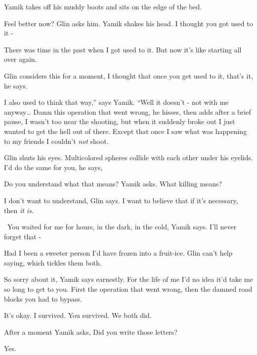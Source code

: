 \documentclass[letterpaper]{article}
\begin{document}
Yamik takes off his muddy boots and sits on the edge of the bed. 

{\textquotedbl}Feel better now?{\textquotedbl} Glin asks him. Yamik shakes his
head.{ }{\textquotedbl}I thought you got used to it -{\textquotedbl} 

{\textquotedbl}There was time in the past when I got used to it. But now it's like starting all over
again.{\textquotedbl} 

Glin considers this for a moment, {\textquotedbl}I thought that once you get used to it, that's it,{\textquotedbl} he
says.

{\textquotedbl}I also used to think that way,'' says Yamik. ``Well it doesn't - not with me anyway{\dots} Damn this
operation that went wrong,{\textquotedbl} he hisses, then adds after a brief pause,{\textquotedbl} I wasn't too near
the shooting, but when it suddenly{ }broke out I
just{ }wanted to get the hell out of there. Except that once I saw what was
happening to my friends I couldn't \textit{not} shoot.{\textquotedbl} 

Glin shuts his eyes. Multicolored spheres collide with each other under his eyelids. {\textquotedbl}I'd do the same for
you,{\textquotedbl} he says,

{\textquotedbl}Do you understand what that means?{\textquotedbl} Yamik asks. {\textquotedbl}What killing
means?{\textquotedbl} 

{\textquotedbl}I don't want to understand,{\textquotedbl} Glin says. {\textquotedbl}I want to believe that if it's
necessary, then \textit{it is}.{\textquotedbl}

~{\textquotedbl}You waited for me for hours, in the dark, in the cold,{\textquotedbl} Yamik says. {\textquotedbl}I'll
never forget that -{\textquotedbl} 

{\textquotedbl}Had I been a sweeter person I'd have frozen into a fruit-ice.{\textquotedbl} Glin can't help saying,
which tickles them both.

{\textquotedbl}So sorry about it,{\textquotedbl} Yamik says earnestly. {\textquotedbl}For the life of me I'd no idea
it'd take me so long to get to you. First the operation that went wrong, then the damned road blocks you had to
bypass.{\textquotedbl}

{\textquotedbl}It's okay. I survived. You survived. We both did.{\textquotedbl}

After a moment Yamik asks, {\textquotedbl}Did you write those letters?{\textquotedbl} 

{\textquotedbl}Yes.{\textquotedbl} 
\end{document}
